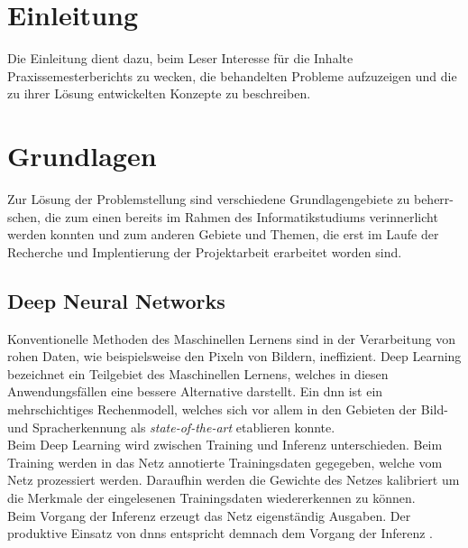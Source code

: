 \documentclass[oneside]{ausarbeitung}
\begin{document}
\cleardoublepage
{}
\setcounter{page}{1}

\chapter{Einleitung}
\label{cha:einleitung}

Die Einleitung dient dazu, beim Leser Interesse für die Inhalte 
Praxissemesterberichts zu wecken, die behandelten Probleme aufzuzeigen 
und die zu ihrer Lösung entwickelten Konzepte zu beschreiben.
\chapter{Grundlagen}
\label{cha:grundlagen}
Zur Lösung der Problemstellung sind verschiedene Grundlagengebiete zu beherr-
schen, die zum einen bereits im Rahmen des Informatikstudiums verinnerlicht werden konnten und zum anderen Gebiete und Themen, die erst im Laufe der Recherche und Implentierung der Projektarbeit erarbeitet worden sind.
\section{Deep Neural Networks}
Konventionelle Methoden des Maschinellen Lernens sind in der Verarbeitung von rohen Daten, wie beispielsweise den Pixeln von Bildern, ineffizient.
Deep Learning bezeichnet ein Teilgebiet des Maschinellen Lernens, welches in diesen Anwendungsfällen eine bessere Alternative darstellt. Ein \ac{dnn} ist ein mehrschichtiges Rechenmodell, welches sich vor allem in den Gebieten der Bild- und Spracherkennung als \textit{state-of-the-art} etablieren konnte.\\
Beim Deep Learning wird zwischen Training und Inferenz unterschieden. Beim Training werden in das Netz annotierte Trainingsdaten gegegeben, welche vom Netz prozessiert werden. Daraufhin werden die Gewichte des Netzes kalibriert um die Merkmale der eingelesenen Trainingsdaten wiedererkennen zu können.\\
Beim Vorgang der Inferenz erzeugt das Netz eigenständig Ausgaben. Der produktive Einsatz von \acp{dnn} entspricht demnach dem Vorgang der Inferenz \cite{deepl-vs-traditional, deepl-lecun}. 
\end{document}
